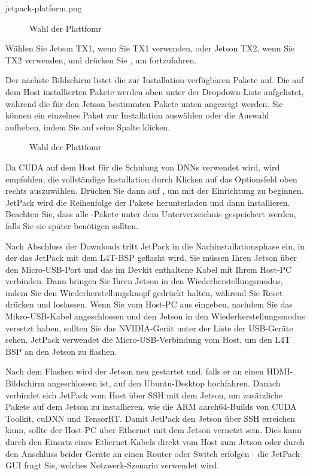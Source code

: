 jetpack-platform.png


\begin{figure}
  
  \caption{Wahl der Plattfomr}
\end{figure}

Wählen Sie Jetson TX1, wenn Sie TX1 verwenden, oder Jetson TX2, wenn Sie TX2 verwenden, und drücken Sie , um fortzufahren.

Der nächste Bildschirm listet die zur Installation verfügbaren Pakete auf. Die auf dem Host installierten Pakete werden oben unter der Dropdown-Liste  aufgelistet, während die für den Jetson bestimmten Pakete unten angezeigt werden. Sie können ein einzelnes Paket zur Installation auswählen oder die Auswahl aufheben, indem Sie auf seine Spalte  klicken.


\begin{figure}
  
  \caption{Wahl der Plattfomr}
\end{figure}


Da CUDA auf dem Host für die Schulung von DNNs verwendet wird, wird empfohlen, die vollständige Installation durch Klicken auf das Optionsfeld oben rechts auszuwählen. Drücken Sie dann auf , um mit der Einrichtung zu beginnen. JetPack wird die Reihenfolge der Pakete herunterladen und dann installieren. Beachten Sie, dass alle -Pakete unter dem Unterverzeichnis  gespeichert werden, falls Sie sie später benötigen sollten. 

Nach Abschluss der Downloads tritt JetPack in die Nachinstallationsphase ein, in der das JetPack mit dem L4T-BSP geflasht wird.  Sie müssen Ihren Jetson über den Micro-USB-Port und das im Devkit enthaltene Kabel mit Ihrem Host-PC verbinden.  Dann bringen Sie Ihren Jetson in den Wiederherstellungsmodus, indem Sie den Wiederherstellungsknopf gedrückt halten, während Sie Reset drücken und loslassen.  Wenn Sie  vom Host-PC aus eingeben, nachdem Sie das Mikro-USB-Kabel angeschlossen und den Jetson in den Wiederherstellungsmodus versetzt haben, sollten Sie das NVIDIA-Gerät unter der Liste der USB-Geräte sehen.  JetPack verwendet die Micro-USB-Verbindung vom Host, um den L4T BSP an den Jetson zu flashen. 

Nach dem Flashen wird der Jetson neu gestartet und, falls er an einen HDMI-Bildschirm angeschlossen ist, auf den Ubuntu-Desktop hochfahren.  Danach verbindet sich JetPack vom Host über SSH mit dem Jetson, um zusätzliche Pakete auf dem Jetson zu installieren, wie die ARM aarch64-Builds von CUDA Toolkit, cuDNN und TensorRT.  Damit JetPack den Jetson über SSH erreichen kann, sollte der Host-PC über Ethernet mit dem Jetson vernetzt sein.  Dies kann durch den Einsatz eines Ethernet-Kabels direkt vom Host zum Jetson oder durch den Anschluss beider Geräte an einen Router oder Switch erfolgen - die JetPack-GUI fragt Sie, welches Netzwerk-Szenario verwendet wird. 

